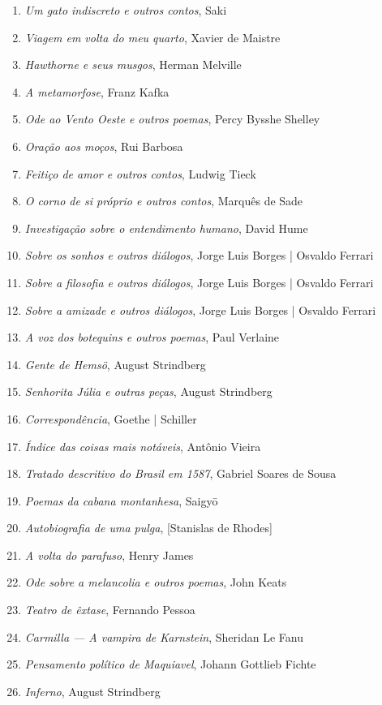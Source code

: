 \begin{enumerate}
\item \textit{Um gato indiscreto e outros contos}, Saki
\item \textit{Viagem em volta do meu quarto}, Xavier de Maistre 
\item \textit{Hawthorne e seus musgos}, Herman Melville
\item \textit{A metamorfose}, Franz Kafka
\item \textit{Ode ao Vento Oeste e outros poemas}, Percy Bysshe Shelley
\item \textit{Oração aos moços}, Rui Barbosa
\item \textit{Feitiço de amor e outros contos}, Ludwig Tieck
\item \textit{O corno de si próprio e outros contos}, Marquês de Sade
\item \textit{Investigação sobre o entendimento humano}, David Hume
\item \textit{Sobre os sonhos e outros diálogos}, Jorge Luis Borges | Osvaldo Ferrari
\item \textit{Sobre a filosofia e outros diálogos}, Jorge Luis Borges | Osvaldo Ferrari
\item \textit{Sobre a amizade e outros diálogos}, Jorge Luis Borges | Osvaldo Ferrari
\item \textit{A voz dos botequins e outros poemas}, Paul Verlaine 
\item \textit{Gente de Hemsö}, August Strindberg 
\item \textit{Senhorita Júlia e outras peças}, August Strindberg 
\item \textit{Correspondência}, Goethe | Schiller
\item \textit{Índice das coisas mais notáveis}, Antônio Vieira
\item \textit{Tratado descritivo do Brasil em 1587}, Gabriel Soares de Sousa
\item \textit{Poemas da cabana montanhesa}, Saigy\=o
\item \textit{Autobiografia de uma pulga}, [Stanislas de Rhodes]
\item \textit{A volta do parafuso}, Henry James
\item \textit{Ode sobre a melancolia e outros poemas}, John Keats 
\item \textit{Teatro de êxtase}, Fernando Pessoa
\item \textit{Carmilla --- A vampira de Karnstein}, Sheridan Le Fanu
\item \textit{Pensamento político de Maquiavel}, Johann Gottlieb Fichte
\item \textit{Inferno}, August Strindberg

\end{enumerate}
